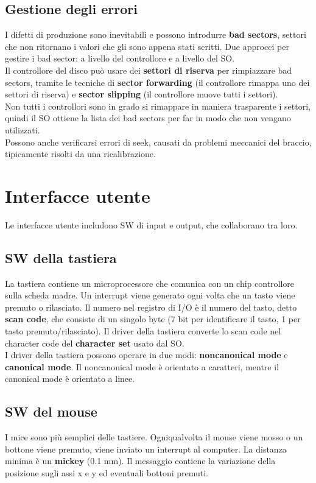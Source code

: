 \documentclass[12pt]{article}
\begin{document}
\subsection{Gestione degli errori}
I difetti di produzione sono inevitabili e possono introdurre \textbf{bad sectors}, settori che non ritornano i valori che 
gli sono appena stati scritti. Due approcci per gestire i bad sector: a livello del controllore e a livello del SO.\\
Il controllore del disco può usare dei \textbf{settori di riserva} per rimpiazzare bad sectors, tramite le tecniche di 
\textbf{sector forwarding} (il controllore rimappa uno dei settori di riserva) e \textbf{sector slipping} (il controllore 
muove tutti i settori).\\
Non tutti i controllori sono in grado si rimappare in maniera trasparente i settori, quindi il SO ottiene la lista dei bad 
sectors per far in modo che non vengano utilizzati.\\
Possono anche verificarsi errori di seek, causati da problemi meccanici del braccio, tipicamente risolti da una ricalibrazione.
\section{Interfacce utente}
Le interfacce utente includono SW di input e output, che collaborano tra loro.
\subsection{SW della tastiera}
La tastiera contiene un microprocessore che comunica con un chip controllore sulla scheda madre. Un interrupt viene generato 
ogni volta che un tasto viene premuto o rilasciato. Il numero nel registro di I/O è il numero del tasto, detto \textbf{scan code}, 
che consiste di un singolo byte (7 bit per identificare il tasto, 1 per tasto premuto/rilasciato). Il driver della tastiera 
converte lo scan code nel character code del \textbf{character set} usato dal SO.\\
I driver della tastiera possono operare in due modi: \textbf{noncanonical mode} e \textbf{canonical mode}. Il noncanonical 
mode è orientato a caratteri, mentre il canonical mode è orientato a linee.
\subsection{SW del mouse}
I mice sono più semplici delle tastiere. Ogniqualvolta il mouse viene mosso o un bottone viene premuto, viene inviato un 
interrupt al computer. La distanza minima è un \textbf{mickey} (0.1 mm). Il messaggio contiene la variazione della posizione 
sugli assi x e y ed eventuali bottoni premuti.
\end{document}
